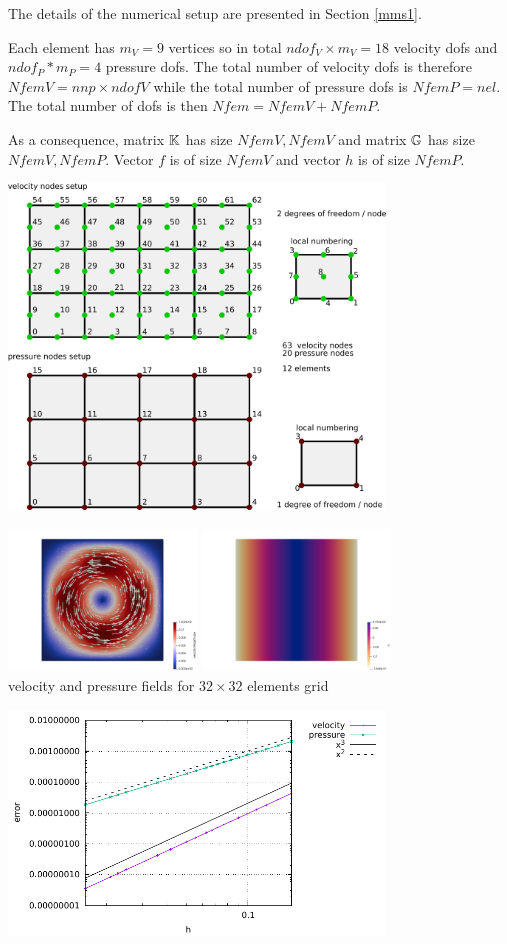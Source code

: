 
The details of the numerical setup are presented in Section \ref{mms1}.

Each element has $m_V=9$ vertices so in total $ndof_V\times m_V=18$ velocity dofs and 
$ndof_P*m_P=4$ pressure dofs. The total number of 
velocity dofs is therefore $NfemV=nnp \times ndofV$ while the total number of
pressure dofs is $NfemP=nel$. The total number of dofs is then $Nfem=NfemV+NfemP$.

As a consequence, matrix ${\mathbb{K}}$ has size $NfemV,NfemV$ and matrix ${\mathbb{G}}$ has size $NfemV,NfemP$.
Vector $f$ is of size $NfemV$ and vector $h$ is of size $NfemP$.  

\begin{center}
\includegraphics[width=10cm]{python_codes/fieldstone_18/images/q2q1setup}
\end{center}

\begin{center}
\includegraphics[width=5cm]{python_codes/fieldstone_18/results/vel}
\includegraphics[width=5cm]{python_codes/fieldstone_18/results/pressure}\\
{\captionfont velocity and pressure fields for $32\times 32$ elements grid}
\end{center}

\begin{center}
\includegraphics[width=10cm]{python_codes/fieldstone_18/results/errors}
\end{center}
